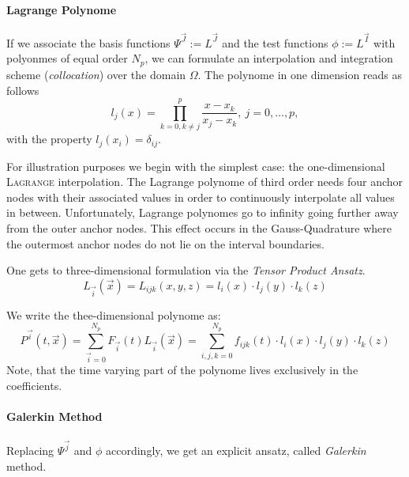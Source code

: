 \paragraph{Lagrange Polynome}
If we associate the basis functions $\Psi^{\vec{J}} := L^{\vec{J}}$ and the test functions $\phi := L^{\vec{I}}$ with
 polyonmes of equal order $N_p$, we can formulate an interpolation and
integration scheme (\emph{collocation}) over the domain $\Omega$. The polynome in one dimension reads as follows
\begin{equation}
l_j(x) = \prod^p_{k=0,k\neq j} \frac{x-x_k}{x_j-x_k}, \ j = 0,\dots,p,
\end{equation}
with the  property $l_j(x_i) = \delta_{ij}$.

For illustration purposes we begin with the simplest case: the one-dimensional
\textsc{Lagrange} interpolation.
 The Lagrange polynome of third order
needs four anchor nodes with their associated values in order to continuously
interpolate all values in between. Unfortunately, Lagrange polynomes go to
infinity going further away from the outer anchor nodes. This effect
occurs in the Gauss-Quadrature where the outermost anchor nodes do not
lie on the interval boundaries.

One gets to three-dimensional formulation via the \emph{Tensor Product Ansatz}.
\newcommand{\LI}{L_{\vec{i}}(\vec{x})}
\begin{equation}
\label{eq-tensor-ansatz}
    \LI = L_{ijk}(x,y,z) = l_i(x) \cdot l_j(y) \cdot l_k(z)
\end{equation}

We write the thee-dimensional polynome as:
\newcommand{\PI}{P^{\vec{i}}(t,\vec{x})}
\newcommand{\FI}{F_{\vec{i}}(t)}
\newcommand{\sumI}{\sum^{N_p}_{\vec{i}=0}}
\begin{equation}
\label{eq-tensor-ansatz}
    \PI = \sumI \FI \LI = \sum^{N_p}_{i,j,k = 0} f_{ijk}(t) \cdot l_i(x) \cdot l_j(y) \cdot l_k(z)
\end{equation}
Note, that the time varying part of the polynome lives exclusively in the coefficients.

\paragraph{Galerkin Method}
Replacing $\Psi^{\vec{j}}$ and $\phi$ accordingly, we get an explicit ansatz,
called \emph{Galerkin} method.
\newcommand{\FJ}{F_{\vec{j}}(t)}
\newcommand{\GJ}{G_{\vec{j}}(t)}
\newcommand{\HJ}{H_{\vec{j}}(t)}

